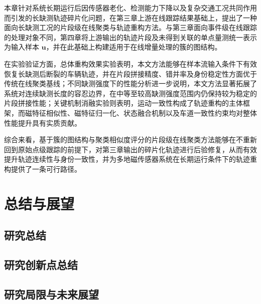 \documentclass{xdupgthesis}
\begin{document}
本章针对系统长期运行后因传感器老化、检测能力下降以及复杂交通工况共同作用而引发的长缺测轨迹碎片化问题，在第三章上游在线跟踪结果基础上，提出了一种面向长缺测工况的片段级在线聚类与轨迹重构方法。与第三章面向事件级在线跟踪的处理对象不同，第四章将上游输出的轨迹片段及未得到关联的单点量测统一表示为输入样本 $\mathbf{u}$，并在此基础上构建适用于在线增量处理的簇的图结构。

在实验验证方面，总体重构效果实验表明，本文方法能够在样本流输入条件下有效恢复长缺测后断裂的车辆轨迹，并在片段拼接精度、错并率及身份稳定性方面优于传统在线聚类基线；不同缺测强度下的性能分析进一步说明，本文方法显著拓展了系统对连续缺测长度的容忍边界，在中等至较高缺测强度范围内仍保持较为稳定的片段拼接性能；关键机制消融实验则表明，运动一致性构成了轨迹重构的主体框架，而磁特征相似性、磁特征归一化、状态融合机制以及车道一致性约束均对整体性能提升具有实质贡献。

综合来看，基于簇的图结构与聚类相似度评分的片段级在线聚类方法能够在不重新回到原始点级跟踪的前提下，对第三章输出的碎片化轨迹进行后验修复，从而有效提升轨迹连续性与身份一致性，并为多地磁传感器系统在长期运行条件下的轨迹重构提供了一条可行路径。



\chapter{总结与展望}

\section{研究总结}



\section{研究创新点总结}



\section{研究局限与未来展望}
\end{document}
